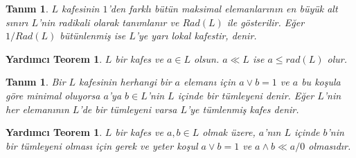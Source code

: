 \documentclass[a4paper,12pt]{article}
\numberwithin{equation}{section}
\theoremstyle{italik}
\newtheorem{lemma}[teorem]{Yardımcı Teorem}
\newtheorem{tanim}[teorem]{Tanım}
\begin{document}

\begin{tanim}
     $L$ kafesinin $ 1 $'den farklı bütün maksimal elemanlarının en büyük alt sınırı $L$'nin radikali olarak tanımlanır ve $Rad(L)$ ile gösterilir. 
     Eğer $ 1/Rad(L) $ bütünlenmiş ise $L$'ye \emph{yarı lokal} kafestir, denir.
\end{tanim}


\begin{lemma} \label{radicin}
 $ L $ bir kafes ve $ a \in L $ olsun. $ a \ll L $ ise $ a \leq rad(L) $ olur.
\end{lemma}


\begin{tanim}
     Bir $ L $ kafesinin herhangi bir $ a $ elemanı için $ a \vee b = 1 $ ve $ a $ bu koşula göre 
minimal oluyorsa $a$'ya $ b \in L$'nin $ L $ içinde bir \textit{tümleyeni} denir. Eğer $ L $'nin her elemanının $ L $'de 
bir tümleyeni varsa $ L $'ye \textit{tümlenmiş kafes} denir.
\end{tanim}


\begin{lemma}\autocite[Yard. Teorem 3.1.1]{toksoy}
  $ L $ bir kafes ve $ a,b  \in L $ olmak üzere, $ a $'nın $ L $ içinde $ b $'nin bir tümleyeni olması için gerek ve yeter koşul 
$ a \vee b =1 $ ve $ a \wedge b \ll a / 0 $ olmasıdır. 
\end{lemma}
\end{document}
